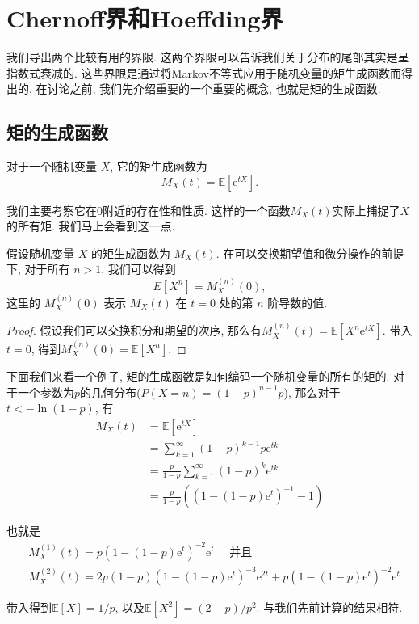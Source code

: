 \section{Chernoff界和Hoeffding界}

我们导出两个比较有用的界限. 这两个界限可以告诉我们关于分布的尾部其实是呈指数式衰减的. 这些界限是通过将Markov不等式应用于随机变量的矩生成函数而得出的. 在讨论之前, 我们先介绍重要的一个重要的概念, 也就是矩的生成函数. 

\subsection{矩的生成函数}

\begin{definition}
    对于一个随机变量 $X$, 它的矩生成函数为$$M_X(t)=\mathbb{E}\left[\mathrm{e}^{t X}\right].$$
\end{definition}

我们主要考察它在0附近的存在性和性质. 这样的一个函数$M_X(t)$实际上捕捉了$X$的所有矩. 我们马上会看到这一点.

\begin{theorem}
    假设随机变量 $X$ 的矩生成函数为 $M_X(t)$. 
在可以交换期望值和微分操作的前提下, 对于所有 $n > 1$, 我们可以得到
$$E[X^n] = M_X^{(n)}(0),$$这里的 $M_X^{(n)}(0)$ 表示 $M_X(t)$ 在 $t = 0$ 处的第 $n$ 阶导数的值. 

\end{theorem}
\begin{proof}
    假设我们可以交换积分和期望的次序, 那么有$M_X^{(n)}(t)=\mathbb{E}\left[X^n \mathrm{e}^{t X}\right]$. 带入$t=0$, 得到$M_X^{(n)}(0)=\mathbb{E}\left[X^n\right]$. 
\end{proof}

\begin{example}
    下面我们来看一个例子, 矩的生成函数是如何编码一个随机变量的所有的矩的. 对于一个参数为$p$的几何分布($P(X=n)=(1-p)^{n-1} p$), 那么对于$t<-\ln(1-p)$, 有
    $$\begin{aligned} M_X(t) & =\mathbb{E}\left[\mathrm{e}^{t X}\right] \\ & =\sum_{k=1}^{\infty}(1-p)^{k-1} p \mathrm{e}^{t k} \\ & =\frac{p}{1-p} \sum_{k=1}^{\infty}(1-p)^k \mathrm{e}^{t k} \\ & =\frac{p}{1-p}\left(\left(1-(1-p) \mathrm{e}^t\right)^{-1}-1\right)\end{aligned}$$

    也就是
    $$\begin{aligned} & M_X^{(1)}(t)=p\left(1-(1-p) \mathrm{e}^t\right)^{-2} \mathrm{e}^t \quad \text { 并且 } \\ & M_X^{(2)}(t)=2 p(1-p)\left(1-(1-p) \mathrm{e}^t\right)^{-3} \mathrm{e}^{2 t}+p\left(1-(1-p) \mathrm{e}^t\right)^{-2} \mathrm{e}^t\end{aligned}$$

    带入得到$\mathbb{E}[X]=1 / p$, 以及$\mathbb{E}\left[X^2\right]=(2-p) / p^2$. 与我们先前计算的结果相符.
\end{example}


